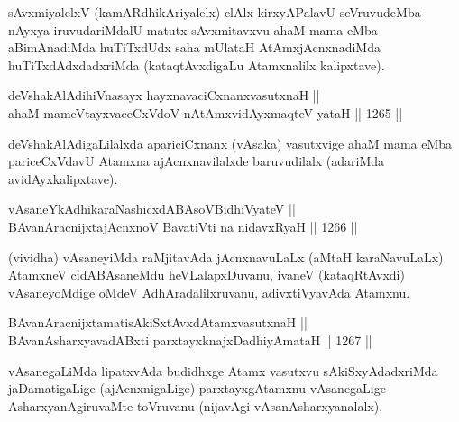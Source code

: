 \begin{artha}
sAvxmiyalelxV (kamARdhikAriyalelx) elAlx kirxyAPalavU seVruvudeMba nAyxya iruvudariMdalU matutx sAvxmitavxvu ahaM mama eMba aBimAnadiMda huTiTxdUdx saha mUlataH AtAmxjAcnxnadiMda huTiTxdAdxdadxriMda (kataqtAvxdigaLu Atamxnalilx kalipxtave).
\end{artha}


\begin{shl}
deVshakAlAdihiVnasayx hayxnavaciCxnanxvasutxnaH || \\
ahaM mameVtayxvaceCxVdoV nA\s \s tAmxvidAyxmaqteV yataH ||  1265 ||  
\end{shl}

\begin{artha}
deVshakAlAdigaLilalxda apariciCxnanx (vAsaka) vasutxvige ahaM mama eMba pariceCxVdavU Atamxna ajAcnxnavilalxde baruvudilalx (adariMda avidAyxkalipxtave).
\end{artha}

\begin{shl}
vAsaneYkAdhikaraNashicxdABAsoV\s BidhiVyateV || \\
BAvanAracnijxtajAcnxnoV BavatiVti na nidavxRyaH ||  1266 ||  
\end{shl}

\begin{artha}
(vividha) vAsaneyiMda raMjitavAda jAcnxnavuLaLx (aMtaH karaNavuLaLx) AtamxneV cidABAsaneMdu heVLalapxDuvanu, ivaneV (kataqRtAvxdi) vAsaneyoMdige oMdeV AdhAradalilxruvanu, adivxtiVyavAda Atamxnu.
\end{artha}


\begin{shl}
BAvanAracnijxtamatisAkiSxtAvxdAtamxvasutxnaH || \\
BAvanAsharxyavadABxti parxtayxknajxDadhiyAmataH ||  1267 ||  
\end{shl}

\begin{artha}
vAsanegaLiMda lipatxvAda budidhxge Atamx vasutxvu sAkiSxyAdadxriMda jaDamatigaLige (ajAcnxnigaLige) parxtayxgAtamxnu vAsanegaLige AsharxyanAgiruvaMte toVruvanu (nijavAgi vAsanAsharxyanalalx).
\end{artha}



